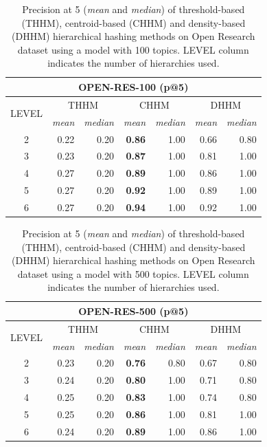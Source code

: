 \begin{table}\centering
  \scriptsize
  \begin{tabular}{c|rr||rr||rr}
    \multicolumn{7}{c}{OPEN-RES-100 (p@5)} \\
    \toprule
    \multirow{2}{*}{LEVEL} &
      \multicolumn{2}{c}{THHM} &
      \multicolumn{2}{c}{CHHM} &
      \multicolumn{2}{c}{DHHM} \\
      & {\textit{mean}} & {\textit{median}} & {\textit{mean}} & {\textit{median}} & {\textit{mean}} & {\textit{median}} \\
      \midrule
    2 & 0.22 & 0.20 & \textbf{0.86} & 1.00 & 0.66 & 0.80 \\
    3 & 0.23 & 0.20 & \textbf{0.87} & 1.00 & 0.81 & 1.00 \\
    4 & 0.27 & 0.20 & \textbf{0.89} & 1.00 & 0.86 & 1.00 \\
    5 & 0.27 & 0.20 & \textbf{0.92} & 1.00 & 0.89 & 1.00 \\
    6 & 0.27 & 0.20 & \textbf{0.94} & 1.00 & 0.92 & 1.00 \\
    \bottomrule
  \end{tabular}
\caption{Precision at 5 (\textit{mean} and \textit{median}) of threshold-based (THHM), centroid-based (CHHM) and density-based (DHHM) hierarchical hashing methods on Open Research dataset using a model with 100 topics. LEVEL column indicates the number of hierarchies used.}
\label{tb:or100-p}
\end{table}

\begin{table}\centering
  \scriptsize
  \begin{tabular}{c|rr||rr||rr}
    \multicolumn{7}{c}{OPEN-RES-500 (p@5)} \\
    \toprule
    \multirow{2}{*}{LEVEL} &
      \multicolumn{2}{c}{THHM} &
      \multicolumn{2}{c}{CHHM} &
      \multicolumn{2}{c}{DHHM} \\
      & {\textit{mean}} & {\textit{median}} & {\textit{mean}} & {\textit{median}} & {\textit{mean}} & {\textit{median}} \\
      \midrule
    2 & 0.23 & 0.20 & \textbf{0.76} & 0.80 & 0.67 & 0.80 \\
    3 & 0.24 & 0.20 & \textbf{0.80} & 1.00 & 0.71 & 0.80 \\
    4 & 0.25 & 0.20 & \textbf{0.83} & 1.00 & 0.74 & 0.80 \\
    5 & 0.25 & 0.20 & \textbf{0.86} & 1.00 & 0.81 & 1.00 \\
    6 & 0.24 & 0.20 & \textbf{0.89} & 1.00 & 0.86 & 1.00 \\
    \bottomrule
  \end{tabular}
\caption{Precision at 5 (\textit{mean} and \textit{median}) of threshold-based (THHM), centroid-based (CHHM) and density-based (DHHM) hierarchical hashing methods on Open Research dataset using a model with 500 topics. LEVEL column indicates the number of hierarchies used.}
\label{tb:or500-p}
\end{table}

